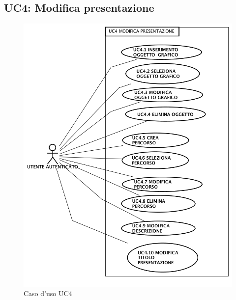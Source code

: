 \subsection{ UC4: Modifica presentazione}

\begin{figure}[h]
	\begin{center}
	\includegraphics[scale=0.4]{diagram/UC4.png}
	\caption{Caso d'uso UC4}
	\end{center}
\end{figure}
